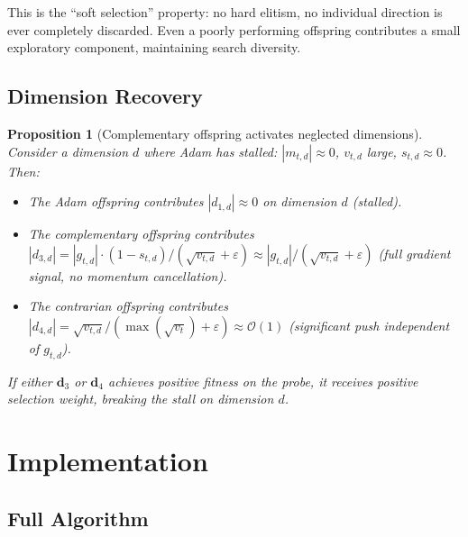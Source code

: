 \documentclass[12pt]{article}
\newtheorem{proposition}{Proposition}
\begin{document}
This is the ``soft selection'' property: no hard elitism, no individual
direction is ever completely discarded.
Even a poorly performing offspring contributes a small exploratory
component, maintaining search diversity.

\subsection{Dimension Recovery}

\begin{proposition}[Complementary offspring activates neglected dimensions]
\label{prop:recovery}
Consider a dimension $d$ where Adam has stalled:
$|m_{t,d}| \approx 0$, $v_{t,d}$ large, $s_{t,d} \approx 0$.
Then:
\begin{itemize}[leftmargin=1.6em, itemsep=2pt]
  \item The Adam offspring contributes $|d_{1,d}| \approx 0$ on
    dimension $d$ (stalled).
  \item The complementary offspring contributes
    $|d_{3,d}| = |g_{t,d}| \cdot (1 - s_{t,d}) / (\sqrt{v_{t,d}}
    + \varepsilon) \approx |g_{t,d}| / (\sqrt{v_{t,d}} + \varepsilon)$
    (full gradient signal, no momentum cancellation).
  \item The contrarian offspring contributes
    $|d_{4,d}| = \sqrt{v_{t,d}} / (\max(\sqrt{v_t}) + \varepsilon)
    \approx \mathcal{O}(1)$ (significant push independent of $g_{t,d}$).
\end{itemize}
If either $\mathbf{d}_3$ or $\mathbf{d}_4$ achieves positive fitness
on the probe, it receives positive selection weight, breaking the
stall on dimension $d$.
\end{proposition}


\section{Implementation}
\label{sec:implementation}

\subsection{Full Algorithm}
\end{document}
